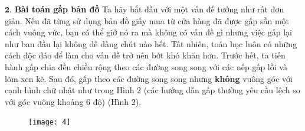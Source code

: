\begin{multicols}{2}
	\vskip 0.1cm
	$\pmb{2.}$ \textbf{\color{toanhocdoisong}Bài toán gấp bản đồ}
	\vskip 0.1cm
	Ta hãy bắt đầu với một vấn đề tưởng như rất đơn giản. Nếu đã từng sử dụng bản đồ giấy mua từ cửa hàng đã được gấp sẵn một cách vuông vức, bạn có thể giở nó ra mà không có vấn đề gì nhưng việc gấp lại như ban đầu lại không dễ dàng chút nào hết.
	\vskip 0.1cm
	Tất nhiên, toán học luôn có những cách độc đáo để làm cho vấn đề trở nên bớt khó khăn hơn. Trước hết, ta tiến hành gấp chia đều chiều rộng theo các đường song song với các nếp gấp lồi và lõm xen kẽ. Sau đó, gấp theo các đường song song nhưng \textbf{\color{toanhocdoisong}không} vuông góc với cạnh hình chữ nhật như trong Hình $2$ (các hướng dẫn gấp thường yêu cầu lệch so với góc vuông khoảng $6$ độ) (Hình $2$).
	\begin{figure}[H]
		\vspace*{-5pt}
		\centering
		\captionsetup{labelformat= empty, justification=centering}
		\texttt{[image: 4]}
		

\end{figure}
\end{multicols}
